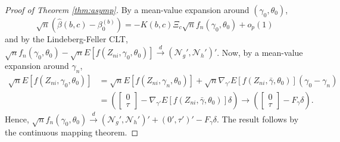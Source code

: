 \begin{proof}[Proof of Theorem \ref{thm:asymp}]
By a mean-value expansion around $(\gamma_0,\theta_0)$,
	$$\sqrt{n}\left(\widehat{\beta}(b,c) - \beta_0^{(b)}\right) = - K(b,c)\Xi_c \sqrt{n} f_n(\gamma_0,\theta_0) + o_p(1)$$
and by the Lindeberg-Feller CLT,
$\sqrt{n} f_n(\gamma_0,\theta_0) - \sqrt{n}E\left[f(Z_{ni},\gamma_0,\theta_0) \right]\overset{d}{\rightarrow} (\mathscr{N}_g', \mathscr{N}_h')'$. 
Now, by a mean-value expansion around $\gamma_n$,
	\begin{align*}
		\sqrt{n}E\left[ f(Z_{ni}, \gamma_0, \theta_0) \right] &= \sqrt{n}E\left[ f(Z_{ni}, \gamma_n,\theta_0) \right] + \sqrt{n}\nabla_{\gamma'}E\left[ f(Z_{ni}, \bar{\gamma},\theta_0) \right] (\gamma_0 -\gamma_n)\\
			&=\left(\left[ \begin{array}{c} 0\\ \tau\end{array}\right] - \nabla_{\gamma'}E\left[ f(Z_{ni}, \bar{\gamma},\theta_0) \right] \delta\right) \rightarrow \left(\left[ \begin{array}{c} 0\\ \tau\end{array}\right] - F_\gamma\delta\right).
	\end{align*}
  Hence, $\sqrt{n}f_n(\gamma_0, \theta_0) \overset{d}{\rightarrow} (\mathscr{N}_g', \mathscr{N}_h')' + (0', \tau')' - F_\gamma \delta$.
  The result follows by the continuous mapping theorem.
\end{proof}

